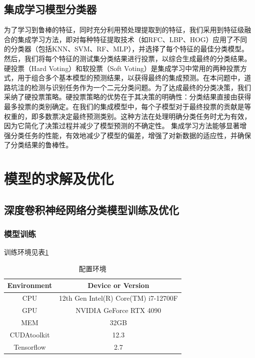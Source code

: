 \documentclass[a4paper, 10pt]{article}
\begin{document}
	
	\subsection{集成学习模型分类器}
	
	为了学习到鲁棒的特征，同时充分利用预处理提取到的特征，我们采用到特征级融合的集成学习方法，即对每种特征提取技术（如RFC、LBP、HOG）应用了不同的分类器（包括KNN、SVM、RF、MLP），并选择了每个特征的最佳分类模型。然后，我们将每个特征的测试集分类结果进行投票，以综合生成最终的分类结果。
	硬投票（Hard Voting）和软投票（Soft Voting）是集成学习中常用的两种投票方式，用于组合多个基本模型的预测结果，以获得最终的集成预测。在本问题中，道路坑洼的检测与识别任务作为一个二元分类问题。为了达成最终的分类决策，我们采纳了硬投票策略。硬投票策略的优势在于其决策的明确性：分类结果直接由获得最多投票的类别确定。在我们的集成模型中，每个子模型对于最终投票的贡献是等权重的，即多数票决定最终预测类别。这种方法在处理明确分类任务时尤为有效，因为它简化了决策过程并减少了模型预测的不确定性\cite{NGO20221}。
	集成学习方法能够显著增强分类任务的性能，有效地减少了模型的偏差，增强了对新数据的适应性，并确保了分类结果的鲁棒性\cite{9266095}。
	
	
	\section{模型的求解及优化}
	
	\subsection{深度卷积神经网络分类模型训练及优化}
	
	\subsubsection{模型训练}
	
	训练环境见表\ref{tab: Environment}
	
	\begin{table}[!htbp]
		\centering
		\tiny
			\begin{tabular}{cc}
				
				\toprule
				
				\textbf{Environment} & \textbf{Device or Version} \\
				
				\hline
				
				CPU & 12th Gen Intel(R) Core(TM) i7-12700F \\
				GPU & NVIDIA GeForce RTX 4090 \\
				MEM & 32GB \\
				CUDAtoolkit & 12.3 \\
				Tensorflow & 2.7 \\
				
				\bottomrule
				
			\end{tabular}
		\caption{\label{tab: Environment}
			配置环境} %
	\end{table}
	
\end{document}
